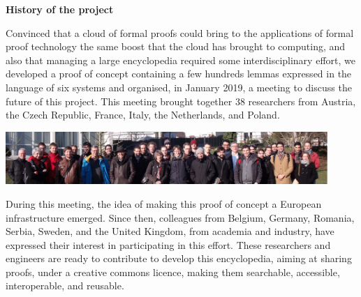 \begin{center}
\end{center}



\begin{shaded}
  \vspace*{-0.5cm}
  \begin{center}
    {\bf \Large History of the project}
  \end{center}

Convinced that a cloud of formal proofs could bring to the
applications of formal proof technology the same boost that the cloud
has brought to computing, and also that managing a large encyclopedia
required some interdisciplinary effort,
we developed a proof of concept containing a few hundreds lemmas
expressed in the language of six systems and organised, in January 2019,
a meeting to discuss the future of this project.
This
meeting brought together 38 researchers from Austria, the Czech
Republic, France, Italy, the Netherlands, and Poland.
\begin{center}
\includegraphics[height=2cm]{img/Photo-reduced.png}
\end{center}
During this meeting, the idea of making this proof of concept a
European infrastructure emerged.  Since then, colleagues from Belgium,
Germany, Romania, Serbia, Sweden, and the United Kingdom, from
academia and industry, have expressed their interest in participating
in this effort.  These researchers and engineers are ready to
contribute to develop this encyclopedia, aiming at sharing proofs,
under a creative commons licence, making them searchable, accessible,
interoperable, and reusable.
\end{shaded}


